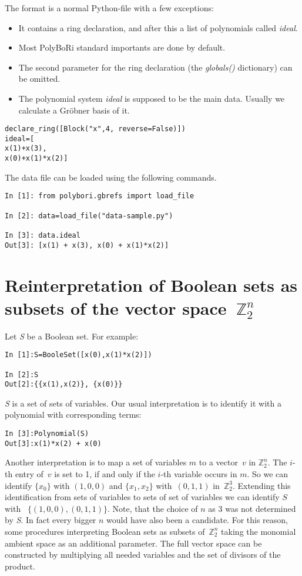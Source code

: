 \documentclass[]{article}
\newcommand{\set}[1]{\{#1\}}
\newcommand{\PolyBoRi}{{\sc PolyBoRi}\xspace}
\newcommand{\Groebner}{Gr\"{o}bner\xspace}
\newcommand{\functionname}[1]{\textit{#1}\xspace}
\newcommand{\pythonconstant}[1]{\textit{#1}\xspace}
\newcommand{\Ztwo}{\mathbb{Z}_2}
\begin{document}
The format is a normal Python-file with a few exceptions:
\begin{itemize}
    \item It contains a ring declaration, and after this a list of polynomials called \functionname{ideal}.
    \item Most \PolyBoRi standard importants are done by default.
    \item The second parameter for the ring declaration (the \functionname{globals()} dictionary) can be omitted.
    \item The polynomial system \functionname{ideal} is supposed to be the main data.
    Usually we calculate a \Groebner basis of it.
\end{itemize}
\begin{lstlisting}
declare_ring([Block("x",4, reverse=False)])
ideal=[
x(1)+x(3),
x(0)+x(1)*x(2)]  
\end{lstlisting}
%
The data file can be loaded using the following commands.
%
\begin{lstlisting}
In [1]: from polybori.gbrefs import load_file

In [2]: data=load_file("data-sample.py")

In [3]: data.ideal
Out[3]: [x(1) + x(3), x(0) + x(1)*x(2)]
\end{lstlisting}

\section{Reinterpretation of Boolean sets as subsets of the vector space~$\Ztwo^n$}
\label{reinterpretation-of-zdd}
Let \pythonconstant{S} be a Boolean set. For example:
\begin{lstlisting}
In [1]:S=BooleSet([x(0),x(1)*x(2)])

In [2]:S
Out[2]:{{x(1),x(2)}, {x(0)}}
\end{lstlisting}

\pythonconstant{S} is a set of sets of variables.
Our usual interpretation is to identify it with a polynomial with corresponding terms:
\begin{lstlisting}
In [3]:Polynomial(S)
Out[3]:x(1)*x(2) + x(0)
\end{lstlisting}
Another interpretation is to map a set of variables $m$ to a vector~$v$ in $\Ztwo^n$.
The $i$-th entry of~$v$ is set to 1, if and only if the $i$-th variable occurs in $m$.
So we can identify $\set{x_0}$ with $(1,0,0)$ and $\set{x_1,x_2}$ with~$(0,1,1)$ in~$\Ztwo^3$.
Extending this identification from sets of variables  to sets of set of variables we can identify $S$ with~%
$\set{(1,0,0), (0,1,1)}$.
Note, that the choice of $n$ as $3$ was not determined by \pythonconstant{S}. In fact every bigger $n$ would have also been a candidate.
For this reason, some procedures interpreting Boolean sets as subsets of~$\Ztwo^n$ taking the monomial ambient space as an additional parameter.
The full vector space can be constructed by multiplying all needed variables and the set of divisors of the product.
\end{document}

